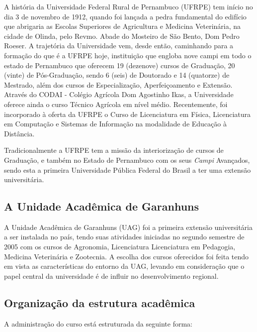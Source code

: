 \documentclass[
	12pt,				%
	openright,			%
  oneside,     %
	a4paper,			%
	english,			%
	french,				%
	spanish,			%
	brazil				%
	]{abntex2}
\begin{document}
A história da Universidade Federal Rural de Pernambuco (UFRPE) tem início no 
dia 3 de novembro de 1912, quando foi lançada a pedra fundamental do
edifício que abrigaria as Escolas Superiores de Agricultura e Medicina
Veterinária, na cidade de Olinda, pelo Revmo. Abade do Mosteiro de São Bento,
Dom Pedro Roeser. A trajetória da Universidade vem, desde então, caminhando
para a formação do que é a UFRPE hoje, instituição que engloba nove campi
em todo o estado de Pernambuco que oferecem 19 (dezenove) cursos de Graduação,
20 (vinte) de Pós-Graduação, sendo 6 (seis) de Doutorado e 14 (quatorze) de
Mestrado, além dos cursos de Especialização, Aperfeiçoamento e Extensão. Através do CODAI -
Colégio Agrícola Dom Agostinho Ikas, a Universidade oferece ainda o curso Técnico Agrícola em nível médio. Recentemente, foi incorporado à oferta da
UFRPE o Curso de Licenciatura em Física, Licenciatura em Computação e Sistemas
de Informação na modalidade de  Educação à Distância.

Tradicionalmente a UFRPE tem a missão da interiorização de cursos de Graduação, e também 
no Estado de Pernambuco com os seus \textit{Campi} Avançados,  sendo esta a primeira Universidade Pública Federal do Brasil a ter uma extensão universitária.

\subsection*{A Unidade Acadêmica de Garanhuns}

A Unidade Acadêmica de Garanhuns (UAG) foi a primeira extensão universitária a ser instalada no país, tendo suas atividades iniciadas no segundo semestre de 2005 com os cursos de Agronomia, Licenciatura Licenciatura em Pedagogia, Medicina Veterinária e Zootecnia. A escolha dos cursos oferecidos foi feita tendo em vista as características do entorno da UAG, levando em consideração que o papel central da universidade é de influir no desenvolvimento regional.

\subsection*{Organização da estrutura acadêmica}

A administração do curso está estruturada da seguinte forma:
\end{document}
